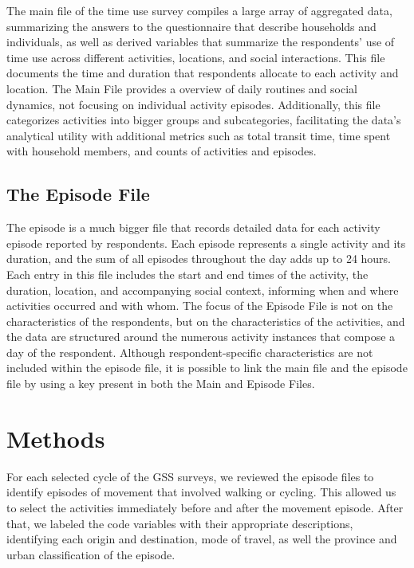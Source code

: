 \documentclass[Royal,times,sageh]{sagej}
\begin{document}
The main file of the time use survey compiles a large array of
aggregated data, summarizing the answers to the questionnaire that
describe households and individuals, as well as derived variables that
summarize the respondents' use of time use across different activities,
locations, and social interactions. This file documents the time and
duration that respondents allocate to each activity and location. The
Main File provides a overview of daily routines and social dynamics, not
focusing on individual activity episodes. Additionally, this file
categorizes activities into bigger groups and subcategories,
facilitating the data's analytical utility with additional metrics such
as total transit time, time spent with household members, and counts of
activities and episodes.

\subsection{The Episode File}\label{the-episode-file}

The episode is a much bigger file that records detailed data for each
activity episode reported by respondents. Each episode represents a
single activity and its duration, and the sum of all episodes throughout
the day adds up to 24 hours. Each entry in this file includes the start
and end times of the activity, the duration, location, and accompanying
social context, informing when and where activities occurred and with
whom. The focus of the Episode File is not on the characteristics of the
respondents, but on the characteristics of the activities, and the data
are structured around the numerous activity instances that compose a day
of the respondent. Although respondent-specific characteristics are not
included within the episode file, it is possible to link the main file
and the episode file by using a key present in both the Main and Episode
Files.

\section{Methods}\label{methods}

For each selected cycle of the GSS surveys, we reviewed the episode
files to identify episodes of movement that involved walking or cycling.
This allowed us to select the activities immediately before and after
the movement episode. After that, we labeled the code variables with
their appropriate descriptions, identifying each origin and destination,
mode of travel, as well the province and urban classification of the
episode.
\end{document}
